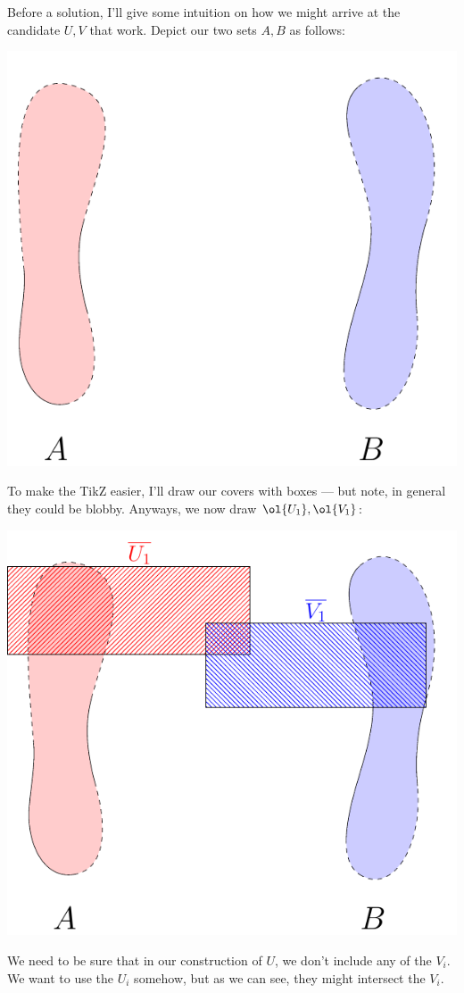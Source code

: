 \documentclass{fkpset}
\begin{document}
  \begin{leftbar}
    Before a solution, I'll give some intuition on how we might arrive
    at the candidate $U,V$ that work. Depict our two sets $A,B$ as
    follows:
    \begin{center}
      \includegraphics{figures/5-29-AB}
    \end{center}
    To make the TikZ easier, I'll draw our covers with boxes --- but
    note, in general they could be blobby. Anyways, we now draw
    $\ol{U_1}, \ol{V_1}$:
    \begin{center}
      \includegraphics{figures/5-29-n=1}
    \end{center}
    We need to be sure that in our construction of $U$, we don't
    include any of the $V_i$. We want to use the $U_i$ somehow, but as
    we can see, they might intersect the $V_i$.
  \end{leftbar}
  \begin{solution}

  \end{solution}
  \clearpage
\end{document}
